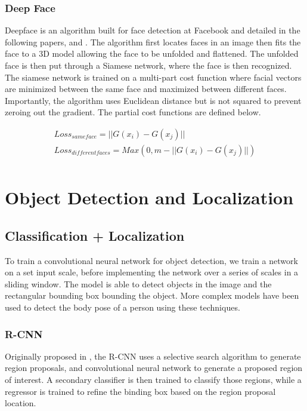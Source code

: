 \subsubsection{Deep Face}\label{subsection:f_deepface}
Deepface is an algorithm built for face detection at Facebook and detailed in the following papers, \cite{Chopra:2005:LSM:1068507.1068961} and \cite{hadsell-chopra-lecun-06}.  
The algorithm first locates faces in an image then fits the face to a 3D model allowing the face to be unfolded and flattened.  
The unfolded face is then put through a Siamese network, where the face is then recognized.  
The siamese network is trained on a multi-part cost function where facial vectors are minimized between the same face and maximized between different faces.  
Importantly, the algorithm uses Euclidean distance but is not squared to prevent zeroing out the gradient.  
The partial cost functions are defined below.


\begin{align*}
    Loss_{same face} = ||G  (x_i)  - G(x_j)|| \\
    Loss_{different faces} = Max(0, m- || G(x_i)  - G(x_j)||) \\
\end{align*}

\section{Object Detection and Localization}\label{section:objectDetection}
\subsection{Classification + Localization}\label{subsection:od_classification}
To train a convolutional neural network for object detection, we train a network on a set input scale, before implementing the network over a series of scales in a sliding window.  
The model is able to detect objects in the image and the rectangular bounding box bounding the object.  
More complex models have been used to detect the body pose of a person using these techniques.

\subsubsection{R-CNN}\label{subsection:od_rcnn}
Originally proposed in \cite{DBLP:journals/corr/GirshickDDM13}, the R-CNN uses a selective search algorithm to generate region proposals, and convolutional neural network to generate a proposed region of interest.  
A secondary classifier is then trained to classify those regions, while a regressor is trained to refine the binding box based on the region proposal location.

